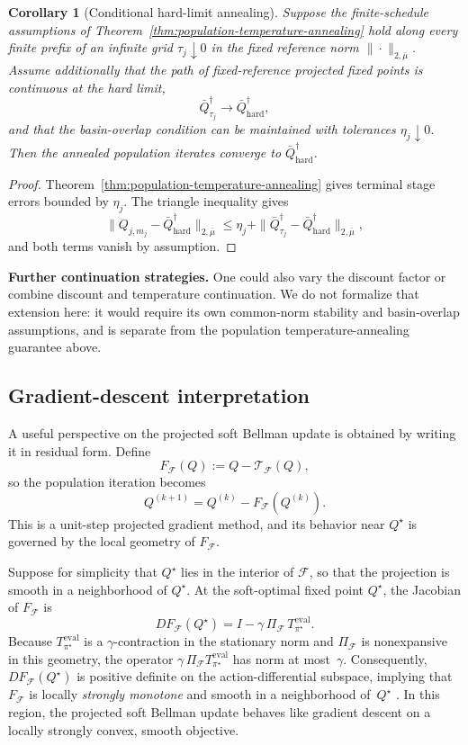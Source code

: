 \documentclass{article}
\theoremstyle{plain}
\newtheorem{corollary}{Corollary}
\theoremstyle{definition}
\theoremstyle{remark}
\begin{document}
\begin{corollary}[Conditional hard-limit annealing]
\label{cor:hard-limit-annealing}
Suppose the finite-schedule assumptions of
Theorem~\ref{thm:population-temperature-annealing} hold along every finite
prefix of an infinite grid $\tau_j\downarrow0$ in the fixed reference norm
$\|\cdot\|_{2,\bar\mu}$. Assume additionally that the path of fixed-reference
projected fixed points is continuous at the hard limit,
\[
\bar Q^\dagger_{\tau_j}
\longrightarrow
\bar Q^\dagger_{\mathrm{hard}},
\]
and that the basin-overlap condition can be maintained with tolerances
$\eta_j\downarrow0$. Then the annealed population iterates converge to
$\bar Q^\dagger_{\mathrm{hard}}$.
\end{corollary}

\begin{proof}
Theorem~\ref{thm:population-temperature-annealing} gives terminal stage errors
bounded by $\eta_j$. The triangle inequality gives
\[
\|Q_{j,m_j}-\bar Q^\dagger_{\mathrm{hard}}\|_{2,\bar\mu}
\le
\eta_j
+
\|\bar Q^\dagger_{\tau_j}
  -\bar Q^\dagger_{\mathrm{hard}}\|_{2,\bar\mu},
\]
and both terms vanish by assumption.
\end{proof}

\medskip
\noindent\textbf{Further continuation strategies.}
One could also vary the discount factor or combine discount and temperature
continuation. We do not formalize that extension here: it would require its own
common-norm stability and basin-overlap assumptions, and is separate from the
population temperature-annealing guarantee above.

\subsection{Gradient-descent interpretation}
\label{sec:grad-desc}

A useful perspective on the projected soft Bellman update is obtained by writing
it in residual form. Define
\[
F_{\mathcal F}(Q) := Q - \mathcal T_{\mathcal F}(Q),
\]
so the population iteration becomes
\[
Q^{(k+1)} = Q^{(k)} - F_{\mathcal F}(Q^{(k)}).
\]
This is a unit-step projected gradient method, and its behavior near $Q^\star$
is governed by the local geometry of $F_{\mathcal F}$.

Suppose for simplicity that $Q^\star$ lies in the interior of $\mathcal{F}$, so
that the projection is smooth in a neighborhood of $Q^\star$. At the
soft-optimal fixed point $Q^\star$, the Jacobian of $F_{\mathcal F}$ is
\[
DF_{\mathcal F}(Q^\star)
=
I - \gamma\,\Pi_{\mathcal F}\,T_{\pi^\star}^{\mathrm{eval}}.
\]
Because $T_{\pi^\star}^{\mathrm{eval}}$ is a $\gamma$-contraction in the
stationary norm and $\Pi_{\mathcal F}$ is nonexpansive in this geometry, the
operator $\gamma\,\Pi_{\mathcal F}T_{\pi^\star}^{\mathrm{eval}}$ has norm at
most~$\gamma$. Consequently, $DF_{\mathcal F}(Q^\star)$ is positive definite on
the action-differential subspace, implying that $F_{\mathcal F}$ is locally
\emph{strongly monotone} and smooth in a neighborhood of~$Q^\star$
\citep{bauschke2011convex}. In this region, the projected soft Bellman update
behaves like gradient descent on a locally strongly convex, smooth objective.
 
\end{document}
